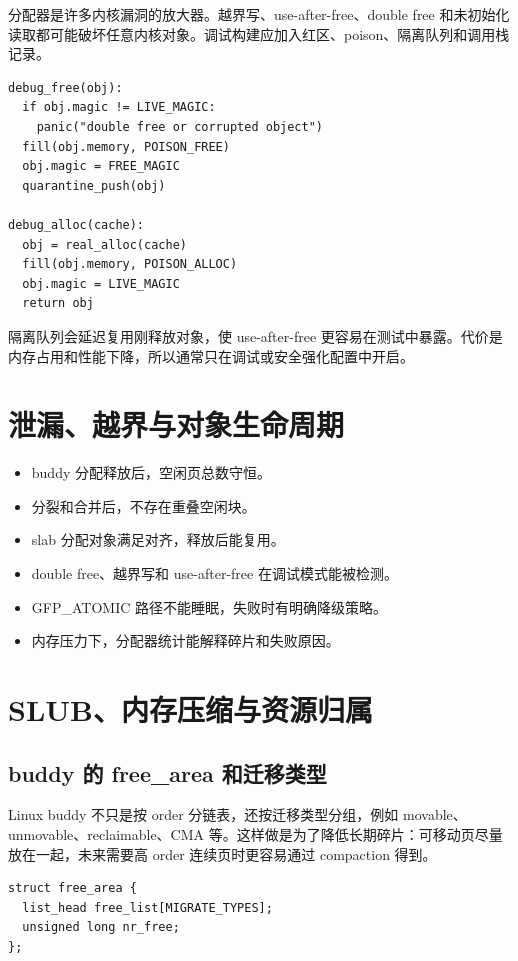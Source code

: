 分配器是许多内核漏洞的放大器。越界写、use-after-free、double free 和未初始化读取都可能破坏任意内核对象。调试构建应加入红区、poison、隔离队列和调用栈记录。

\begin{lstlisting}
debug_free(obj):
  if obj.magic != LIVE_MAGIC:
    panic("double free or corrupted object")
  fill(obj.memory, POISON_FREE)
  obj.magic = FREE_MAGIC
  quarantine_push(obj)

debug_alloc(cache):
  obj = real_alloc(cache)
  fill(obj.memory, POISON_ALLOC)
  obj.magic = LIVE_MAGIC
  return obj
\end{lstlisting}

隔离队列会延迟复用刚释放对象，使 use-after-free 更容易在测试中暴露。代价是内存占用和性能下降，所以通常只在调试或安全强化配置中开启。

\section{泄漏、越界与对象生命周期}

\begin{itemize}
\tightlist
\item buddy 分配释放后，空闲页总数守恒。
\item 分裂和合并后，不存在重叠空闲块。
\item slab 分配对象满足对齐，释放后能复用。
\item double free、越界写和 use-after-free 在调试模式能被检测。
\item GFP\_ATOMIC 路径不能睡眠，失败时有明确降级策略。
\item 内存压力下，分配器统计能解释碎片和失败原因。
\end{itemize}

\section{SLUB、内存压缩与资源归属}

\subsection{buddy 的 free\_area 和迁移类型}

Linux buddy 不只是按 order 分链表，还按迁移类型分组，例如 movable、unmovable、reclaimable、CMA 等。这样做是为了降低长期碎片：可移动页尽量放在一起，未来需要高 order 连续页时更容易通过 compaction 得到。

\begin{lstlisting}
struct free_area {
  list_head free_list[MIGRATE_TYPES];
  unsigned long nr_free;
};
\end{lstlisting}

